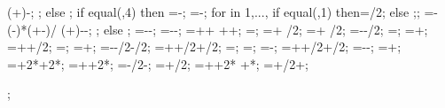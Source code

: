 {{{{		(\structheight+\isomidy)-\latloadshift;
	};
} else {};
if equal(\latloadtype,4) then {
	=-\latloadshift;
	=-\isomidy;
	for \iarr in {1,...,{\levelnumber}}{
		if equal(\iarr,1) then{\addtempy=\supportheight/2;} else {;};
		\arrstartx{\iarr}=-(\toparrlen-\basearrlen)*(\y{\iarr}+\isomidy-\addtempy)/
		(\structheight+\isomidy)-\latloadshift-\basearrlen;
	};
} else {};
\engbedrockstartx=-\leftsoildist-\engbedrockleftdist;
\engbedrockstarty=-\soilbelowfoundtof-\engbedrockdepth;
\engbedrockdeltax=\leftsoildist+\engbedrockleftdist+
  \buildingwidth+\rightsoildist+\engbedrockrightdist;
\engbedrockdeltay=\engbedrockdepth;
\engbedrockmidx=\engbedrockstartx + \engbedrockdeltax/2;
\engbedrockmidy=\engbedrockstarty + \engbedrockdeltay/2;
\translayerleftstartx=-\leftsoildist-\translayerlinet/2;
\translayerleftstarty=\basewalldepth;
\translayerleftdeltay=\basewalldepth+\soilbelowfoundtof;
\translayerrightstartx=\rightsoildist+\buildingwidth+\translayerlinet/2;
\translayerrightstarty=\basewalldepth;
\translayerrightdeltay=\basewalldepth+\soilbelowfoundtof;
\ssinterleftstartx=-\supportwidth-\baselinet/2-\ssinterlinet/2;
\ssinterrightstartx=\buildingwidth+\supportwidth+\baselinet/2+\ssinterlinet/2;
\ssinterleftstarty=\basewalldepth;
\ssinterrightstarty=\basewalldepth;
\ssinterdeltax=\ssinterrightstartx-\ssinterleftstartx;
\ssinterdeltay=\basewalldepth+\supportheight+\baselinet/2+\ssinterlinet/2;
\markssleftstartx=-\supportwidth-\markssexspace;
\markssleftstarty=\basewalldepth+\markssexspace;
\markssdeltax=\buildingwidth+2*\supportwidth+2*\markssexspace;
\markssdeltay=\basewalldepth+\supportheight+2*\markssexspace;
\supershadestartx=-\collinet/2-\supershadespace;
\supershadestarty=\basewalldepth+\baselinet/2;
\supershadedeltax=\buildingwidth+\collinet+2*\supershadespace
 +*\showdefl;
\supershadedeltay=\superstorynumber*\storyheight+\beamlinet/2+\supershadespace;
}   %

\begin{scope}[x=1pt, y=1pt, xshift=\startx, yshift=\starty, rotate=0];


\end{scope}}
